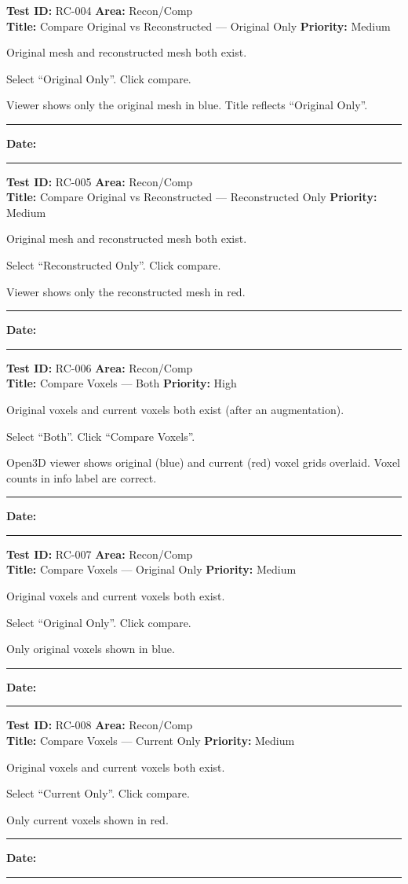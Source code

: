 \documentclass[12pt,a4paper]{article}
\newenvironment{testcase}[4]{%
  \smallskip
  \noindent\textbf{Test ID:} #1 \hfill \textbf{Area:} #2 \\
  \textbf{Title:} #3 \hfill \textbf{Priority:} #4
  \begin{description}[leftmargin=2em,style=nextline]
    \item[\textbf{Preconditions:}]
}{%
    \item[\textbf{Steps:}]
    \item[\textbf{Expected Result:}]
    \item[\textbf{Status:}] \rule{3cm}{0.4pt} \hspace{1em} \textbf{Date:} \rule{3cm}{0.4pt}
    \item[\textbf{Notes:}]
  \end{description}
  \smallskip
}
\begin{document}
\begin{testcase}{RC-004}{Recon/Comp}{Compare Original vs Reconstructed --- Original Only}{Medium}
  \item Original mesh and reconstructed mesh both exist.
  \item Select ``Original Only''. Click compare.
  \item Viewer shows only the original mesh in blue. Title reflects ``Original Only''.
\end{testcase}

\begin{testcase}{RC-005}{Recon/Comp}{Compare Original vs Reconstructed --- Reconstructed Only}{Medium}
  \item Original mesh and reconstructed mesh both exist.
  \item Select ``Reconstructed Only''. Click compare.
  \item Viewer shows only the reconstructed mesh in red.
\end{testcase}

\begin{testcase}{RC-006}{Recon/Comp}{Compare Voxels --- Both}{High}
  \item Original voxels and current voxels both exist (after an augmentation).
  \item Select ``Both''. Click ``Compare Voxels''.
  \item Open3D viewer shows original (blue) and current (red) voxel grids overlaid. Voxel counts in info label are correct.
\end{testcase}

\begin{testcase}{RC-007}{Recon/Comp}{Compare Voxels --- Original Only}{Medium}
  \item Original voxels and current voxels both exist.
  \item Select ``Original Only''. Click compare.
  \item Only original voxels shown in blue.
\end{testcase}

\begin{testcase}{RC-008}{Recon/Comp}{Compare Voxels --- Current Only}{Medium}
  \item Original voxels and current voxels both exist.
  \item Select ``Current Only''. Click compare.
  \item Only current voxels shown in red.
\end{testcase}
\end{document}
